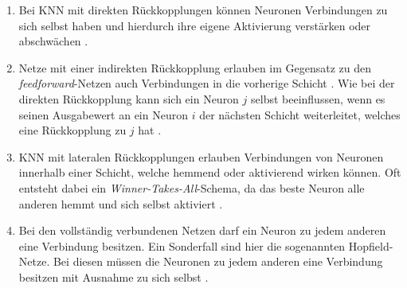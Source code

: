 \begin{enumerate}
	\item Bei \ac{KNN} mit direkten Rückkopplungen können Neuronen Verbindungen zu sich selbst haben und hierdurch ihre eigene Aktivierung verstärken oder abschwächen \cite{zell2003simulation}.
	\item Netze mit einer indirekten Rückkopplung erlauben im Gegensatz zu den \emph{feedforward}-Netzen auch Verbindungen in die vorherige Schicht \cite{zell2003simulation}. Wie bei der direkten Rückkopplung kann sich ein Neuron $j$ selbst beeinflussen, wenn es seinen Ausgabewert an ein Neuron $i$ der nächsten Schicht weiterleitet, welches eine Rückkopplung zu $j$ hat \cite{kriesel2008kleiner}.
	\item \ac{KNN} mit lateralen Rückkopplungen erlauben Verbindungen von Neuronen innerhalb einer Schicht, welche hemmend oder aktivierend wirken können. Oft entsteht dabei ein \emph{Winner-Takes-All}-Schema, da das beste Neuron alle anderen hemmt und sich selbst aktiviert \cite{kriesel2008kleiner}.
	\item Bei den vollständig verbundenen Netzen darf ein Neuron zu jedem anderen eine Verbindung besitzen. Ein Sonderfall sind hier die sogenannten Hopfield-Netze. Bei diesen müssen die Neuronen zu jedem anderen eine Verbindung besitzen mit Ausnahme zu sich selbst \cite{kriesel2008kleiner}.  
\end{enumerate}

